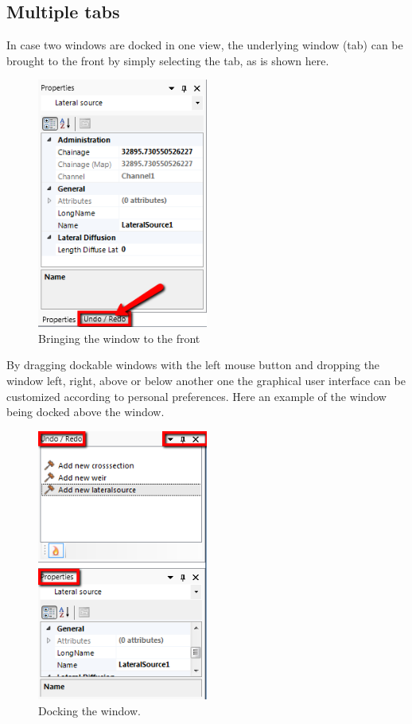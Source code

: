 \subsection{Multiple tabs}
\label{subsec:multipletabs}
In case two windows are docked in one view, the underlying window (tab) can be brought to the front by simply selecting the tab, as is shown here.
%
\begin{figure} [H]
	\centering
		\includegraphics[width=0.5\textwidth]{Figures/Chapter_overview/example_docking_UndoRedo_1.png}
	\caption{Bringing the  window to the front}
\end{figure}
%
By dragging dockable windows with the left mouse button and dropping the window left, right, above or below another one the graphical user interface can be customized according to personal preferences. Here an example of the  window being docked above the  window.
%
\begin{figure} [H]
	\centering
		\includegraphics[width=0.5\textwidth]{Figures/Chapter_overview/example_docking_UndoRedo_2.png}
	\caption{Docking the  window.}
	\label{fig:docking}
\end{figure}
